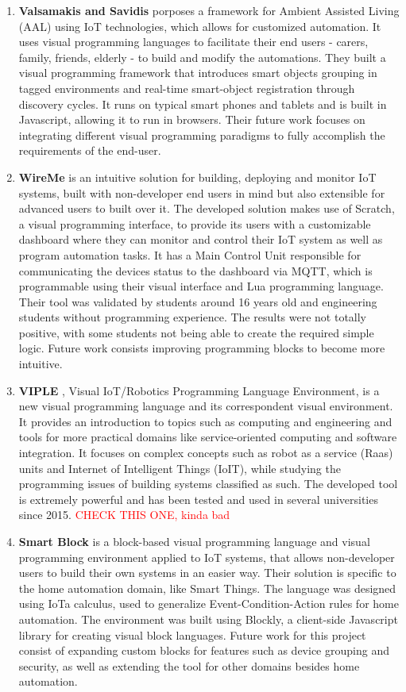 \begin{enumerate}
    \item \textbf{Valsamakis and Savidis} \cite{Valsamakis2017} porposes a framework for Ambient Assisted Living (AAL) using IoT technologies, which allows for customized automation. It uses visual programming languages to facilitate their end users - carers, family, friends, elderly - to build and modify the automations. They built a visual programming framework that introduces smart objects grouping in tagged environments and real-time smart-object registration through discovery cycles. It runs on typical smart phones and tablets and is built in Javascript, allowing it to run in browsers. Their future work focuses on integrating different visual programming paradigms to fully accomplish the requirements of the end-user.
    \item \textbf{WireMe} \cite{wireme} is an intuitive solution for building, deploying and monitor IoT systems, built with non-developer end users in mind but also extensible for advanced users to built over it. The developed solution makes use of Scratch, a visual programming interface, to provide its users with a customizable dashboard where they can monitor and control their IoT system as well as program automation tasks. It has a Main Control Unit responsible for communicating the devices status to the dashboard via MQTT, which is programmable using their visual interface and Lua programming language. Their tool was validated by students around 16 years old and engineering students without programming experience. The results were not totally positive, with some students not being able to create the required simple logic. Future work consists improving programming blocks to become more intuitive.
    \item \textbf{VIPLE} \cite{viple}, Visual IoT/Robotics Programming Language Environment, is a new visual programming language and its correspondent visual environment. It provides an introduction to topics such as computing and engineering and tools for more practical domains like service-oriented computing and software integration. It focuses on complex concepts such as robot as a service (Raas) units and Internet of Intelligent Things (IoIT), while studying the programming issues of building systems classified as such. The developed tool is extremely powerful and has been tested and used in several universities since 2015. \textcolor{red}{CHECK THIS ONE, kinda bad}
    \item \textbf{Smart Block} \cite{smart_block} is a block-based visual programming language and visual programming environment applied to IoT systems, that allows non-developer users to build their own systems in an easier way. Their solution is specific to the home automation domain, like Smart Things. The language was designed using IoTa calculus, used to generalize Event-Condition-Action rules for home automation. The environment was built using Blockly, a client-side Javascript library for creating visual block languages. Future work for this project consist of expanding custom blocks for features such as device grouping and security, as well as extending the tool for other domains besides home automation.

\end{enumerate}
